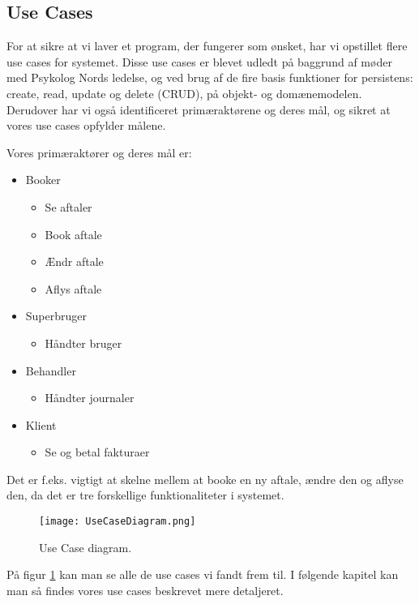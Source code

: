 \subsection{Use Cases}
For at sikre at vi laver et program, der fungerer som ønsket, har vi opstillet flere use cases for systemet.
Disse use cases er blevet udledt på baggrund af møder med Psykolog Nords ledelse, og ved brug af de fire basis funktioner for persistens: create, read, update og delete (CRUD), på objekt- og domænemodelen.
Derudover har vi også identificeret primæraktørene og deres mål, og sikret at vores use cases opfylder målene.

Vores primæraktører og deres mål er:

\begin{itemize}
    \item Booker
        \begin{itemize}
            \item Se aftaler
            \item Book aftale
            \item Ændr aftale
            \item Aflys aftale
        \end{itemize}
    \item Superbruger
        \begin{itemize}
            \item Håndter bruger
        \end{itemize}
    \item Behandler
        \begin{itemize}
            \item Håndter journaler
        \end{itemize}
    \item Klient
        \begin{itemize}
            \item Se og betal fakturaer
        \end{itemize}
\end{itemize}

Det er f.eks. vigtigt at skelne mellem at booke en ny aftale, ændre den og aflyse den, da det er tre forskellige funktionaliteter i systemet.

\begin{figure}[p]
	\centering
  		\texttt{[image: UseCaseDiagram.png]}
  \caption{Use Case diagram.}
  \label{fig:UseCaseDiagram}
\end{figure}

På figur \ref{fig:UseCaseDiagram} kan man se alle de use cases vi fandt frem til. 
I følgende kapitel kan man så findes vores use cases beskrevet mere detaljeret.

